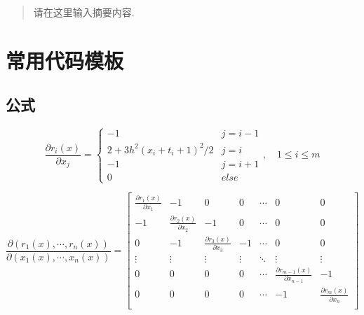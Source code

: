 \documentclass{zjgsureport}
\date{\zhtoday}
\begin{document}
\makecover  %

\begin{abstract}
请在这里输入摘要内容.
\end{abstract}
\newpage


\thispagestyle{empty}
\tableofcontents



\newpage
\setcounter{page}{1}


\section{常用代码模板}


\subsection{公式} 

\begin{equation*}
    \frac{\partial r_i(x)}{\partial x_j}=
    \begin{cases} -1& j=i-1\\ 2+3h^2(x_i+t_i+1)^2/2& j=i\\ -1& j=i+1\\0& else \end{cases}
    ,\quad 1\leq i \leq m
\end{equation*}



\begin{equation*}
\frac{\partial(r_1(x),\cdots,r_n(x))}{\partial (x_1(x),\cdots,x_n(x))}=
\begin{bmatrix}
\frac{\partial r_1(x)}{\partial x_1} & -1 & 0 & 0& \cdots & 0& 0 \\
-1 & \frac{\partial r_2(x)}{\partial x_2} & -1& 0 & \cdots & 0 & 0\\
0& -1 & \frac{\partial r_3(x)}{\partial x_3} & -1  & \cdots& 0& 0 \\
\vdots & \vdots & \vdots & \vdots & \ddots& \vdots& \vdots \\
0 & 0 &0 & 0 & \cdots & \frac{\partial r_{m-1}(x)}{\partial x_{n-1}}& -1\\
0 & 0 &0 & 0 & \cdots & -1 &\frac{\partial r_m(x)}{\partial x_n}\\
\end{bmatrix}
\end{equation*}
\end{document}
